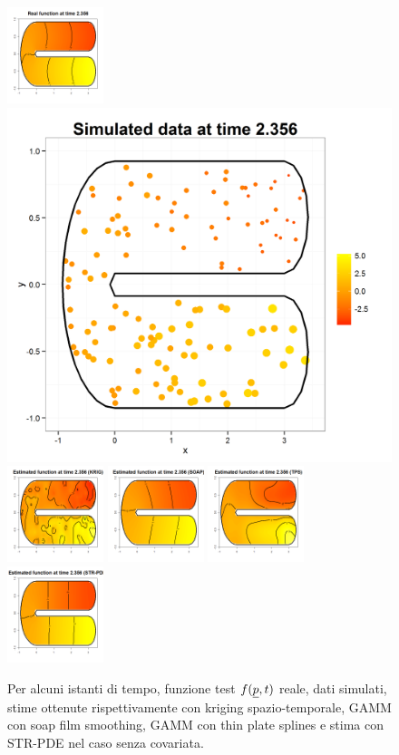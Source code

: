 \documentclass[a4paper,11pt,twoside,openright]{book}							%
\begin{document}
\begin{landscape}
\begin{figure}
\includegraphics[width=0.25\textwidth]{immagini/simulazioni/REALEtempo4.png}
\includegraphics[height=0.25\textwidth]{immagini/simulazioni/Dati_tempo4.png}
\includegraphics[width=0.25\textwidth]{immagini/simulazioni/KRIGtempo4.png}
\includegraphics[width=0.25\textwidth]{immagini/simulazioni/SOAPtempo4.png}
\includegraphics[width=0.25\textwidth]{immagini/simulazioni/TPStempo4.png}
\includegraphics[width=0.25\textwidth]{immagini/simulazioni/STSRtempo4.png}

\caption{Per alcuni istanti di tempo, funzione test $f(\protect\underline{p},t)$ reale, dati simulati, stime ottenute rispettivamente con kriging spazio-temporale, GAMM con soap film smoothing, GAMM con thin plate splines e stima con STR-PDE nel caso senza covariata.}
\label{fig:confronto_altri_metodi_nocov}
\end{figure}
\end{landscape}
\end{document}
